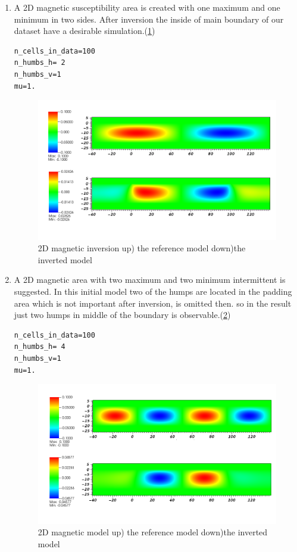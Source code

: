 \begin{enumerate}
\item A 2D magnetic susceptibility area is created with one maximum and one minimum in two sides. After inversion the inside of main boundary of our dataset have a desirable simulation.(\ref{fig:mag2D2}) 
\begin{verbatim}
n_cells_in_data=100
n_humbs_h= 2
n_humbs_v=1
mu=1.
\end{verbatim}

\begin{figure}
\centering
\includegraphics[width=\textwidth]{mag2D2.png}
\caption{2D magnetic inversion up) the reference model  down)the inverted model}
\label{fig:mag2D2}
\end{figure}

\item A 2D magnetic area with two maximum and two minimum intermittent is suggested. In this initial model two of the humps are located in the padding area which is not important after inversion, is omitted then. so in the result just two humps in middle of the boundary is observable.(\ref{fig:mag2D4})

\begin{verbatim}
n_cells_in_data=100
n_humbs_h= 4
n_humbs_v=1
mu=1.
\end{verbatim}

\begin{figure}
\centering
\includegraphics[width=\textwidth]{mag2D4.png}
\caption{2D magnetic model up) the reference model  down)the inverted model}
\label{fig:mag2D4}
\end{figure}


\end{enumerate}
